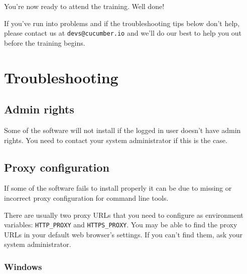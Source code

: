 \documentclass[a4paper,12pt]{report}
\begin{document}


You're now ready to attend the training. Well done! 

If you've run into problems and if the troubleshooting tips below don't
help, please contact us at \texttt{devs@cucumber.io} and we'll do our best to help you out before the training begins.

\chapter*{Troubleshooting}

\section*{Admin rights}

Some of the software will not install if the logged in user doesn't have admin rights.
You need to contact your system administrator if this is the case.

\section*{Proxy configuration}

If some of the software fails to install properly it can be due to missing or incorrect proxy configuration for command line tools.

There are usually two proxy URLs that you need to configure as environment variables: \texttt{HTTP_PROXY} and \texttt{HTTPS_PROXY}.
You may be able to find the proxy URLs in your default web browser's settings. If you can't find them, ask your system administrator.

\subsection*{Windows}
\end{document}

